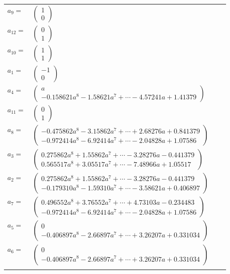 \documentclass[1p]{elsarticle_modified}
\theoremstyle{definition}
\begin{document}
\begin{tabular}{m{7pt} m{180pt} m{7pt} m{180pt} }
\flushright $a_{9}=$&$\begin{pmatrix}1\\0\end{pmatrix}$ \\
\flushright $a_{12}=$&$\begin{pmatrix}0\\1\end{pmatrix}$ \\
\flushright $a_{10}=$&$\begin{pmatrix}1\\1\end{pmatrix}$ \\
\flushright $a_{1}=$&$\begin{pmatrix}-1\\0\end{pmatrix}$ \\
\flushright $a_{4}=$&$\begin{pmatrix}a\\-0.158621 a^{8}-1.58621 a^{7}+\cdots-4.57241 a+1.41379\end{pmatrix}$ \\
\flushright $a_{11}=$&$\begin{pmatrix}0\\1\end{pmatrix}$ \\
\flushright $a_{8}=$&$\begin{pmatrix}-0.475862 a^{8}-3.15862 a^{7}+\cdots+2.68276 a+0.841379\\-0.972414 a^{8}-6.92414 a^{7}+\cdots-2.04828 a+1.07586\end{pmatrix}$ \\
\flushright $a_{3}=$&$\begin{pmatrix}0.275862 a^{8}+1.55862 a^{7}+\cdots-3.28276 a-0.441379\\0.565517 a^{8}+3.05517 a^{7}+\cdots-7.48966 a+1.05517\end{pmatrix}$ \\
\flushright $a_{2}=$&$\begin{pmatrix}0.275862 a^{8}+1.55862 a^{7}+\cdots-3.28276 a-0.441379\\-0.179310 a^{8}-1.59310 a^{7}+\cdots-3.58621 a+0.406897\end{pmatrix}$ \\
\flushright $a_{7}=$&$\begin{pmatrix}0.496552 a^{8}+3.76552 a^{7}+\cdots+4.73103 a-0.234483\\-0.972414 a^{8}-6.92414 a^{7}+\cdots-2.04828 a+1.07586\end{pmatrix}$ \\
\flushright $a_{5}=$&$\begin{pmatrix}0\\-0.406897 a^{8}-2.66897 a^{7}+\cdots+3.26207 a+0.331034\end{pmatrix}$ \\
\flushright $a_{6}=$&$\begin{pmatrix}0\\-0.406897 a^{8}-2.66897 a^{7}+\cdots+3.26207 a+0.331034\end{pmatrix}$\\&\end{tabular}
\end{document}
